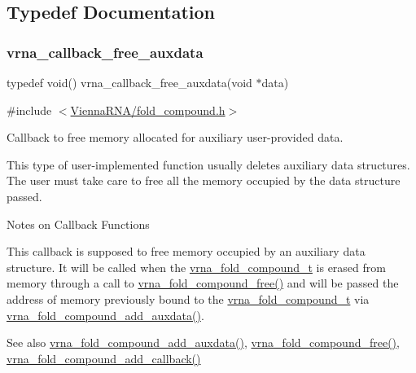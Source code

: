 \subsection{Typedef Documentation}
\mbox{\label{group__fold__compound_ga7806651f51b195013839a218b3bbd5a3}} 
\subsubsection{\texorpdfstring{vrna\+\_\+callback\+\_\+free\+\_\+auxdata}{vrna\_callback\_free\_auxdata}}
{\footnotesize\ttfamily typedef void() vrna\+\_\+callback\+\_\+free\+\_\+auxdata(void $\ast$data)}



{\ttfamily \#include $<$\hyperlink{fold__compound_8h}{Vienna\+R\+N\+A/fold\+\_\+compound.\+h}$>$}



Callback to free memory allocated for auxiliary user-\/provided data. 

This type of user-\/implemented function usually deletes auxiliary data structures. The user must take care to free all the memory occupied by the data structure passed.

\begin{DoxyRefDesc}{Notes on Callback Functions}
\item[\hyperlink{callbacks__callbacks000001}{Notes on Callback Functions}]This callback is supposed to free memory occupied by an auxiliary data structure. It will be called when the \hyperlink{group__fold__compound_ga1b0cef17fd40466cef5968eaeeff6166}{vrna\+\_\+fold\+\_\+compound\+\_\+t} is erased from memory through a call to \hyperlink{group__fold__compound_ga576a077b418a9c3650e06f8e5d296fc2}{vrna\+\_\+fold\+\_\+compound\+\_\+free()} and will be passed the address of memory previously bound to the \hyperlink{group__fold__compound_ga1b0cef17fd40466cef5968eaeeff6166}{vrna\+\_\+fold\+\_\+compound\+\_\+t} via \hyperlink{group__fold__compound_gafc44c76a1aacf61bfccb8cd698772b98}{vrna\+\_\+fold\+\_\+compound\+\_\+add\+\_\+auxdata()}. \end{DoxyRefDesc}


\begin{DoxySeeAlso}{See also}
\hyperlink{group__fold__compound_gafc44c76a1aacf61bfccb8cd698772b98}{vrna\+\_\+fold\+\_\+compound\+\_\+add\+\_\+auxdata()}, \hyperlink{group__fold__compound_ga576a077b418a9c3650e06f8e5d296fc2}{vrna\+\_\+fold\+\_\+compound\+\_\+free()}, \hyperlink{group__fold__compound_ga680ddfe1e67d1459689b1e92c80b9c4c}{vrna\+\_\+fold\+\_\+compound\+\_\+add\+\_\+callback()}
\end{DoxySeeAlso}

